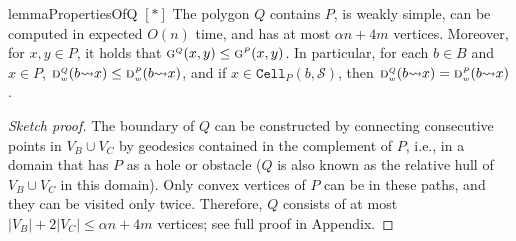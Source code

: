\documentclass[a4paper,UKenglish]{socg-lipics-v2018}
\newcommand{\s}{\mathcal S}
\newcommand{\g}[3][P]{\ensuremath{\textsc{g}^{\scriptscriptstyle #1}(#2, #3)}}
\newcommand{\dd}[3][P]{\ensuremath{\textsc{d}_{\scriptscriptstyle w}^{\scriptscriptstyle #1}(#2 {\leadsto} #3)}}
\newcommand{\cell}[2][P]{\ensuremath{\mathtt{Cell}_{\scriptscriptstyle #1}(#2)}}
\begin{document}
\begin{restatable}{lemma}{PropertiesOfQ}\label{lemma:PropertiesOfQ}
$[*]$ 
The polygon $Q$ contains $P$, is weakly simple, can be computed in expected $O(n)$ time, and has at most $\alpha n + 4m$ vertices.
Moreover, for $x,y\in P$, it holds that $\g[Q]{x}{y} \leq \g{x}{y}$. 
In particular, for each $b\in B$ and $x\in P$, $\dd[Q]{b}{x} \leq \dd{b}{x}$, and if $x\in \cell{b, \s}$, then $\dd[Q]{b}{x} = \dd{b}{x}$.
\end{restatable}
\begin{proof}[Sketch proof]
The boundary of $Q$ can be constructed by connecting consecutive points in $V_B\cup V_C$ by geodesics contained in the complement of $P$, i.e., in a domain that has $P$ as a hole or obstacle ($Q$ is also known as the relative hull of $V_B\cup V_C$ in this domain). 
Only convex vertices of $P$ can be in these paths, and they can be visited only twice.
Therefore, $Q$ consists of at most $|V_B| +  2|V_C| \leq \alpha n + 4m$ vertices; see full proof in Appendix. 
\end{proof}
\end{document}
